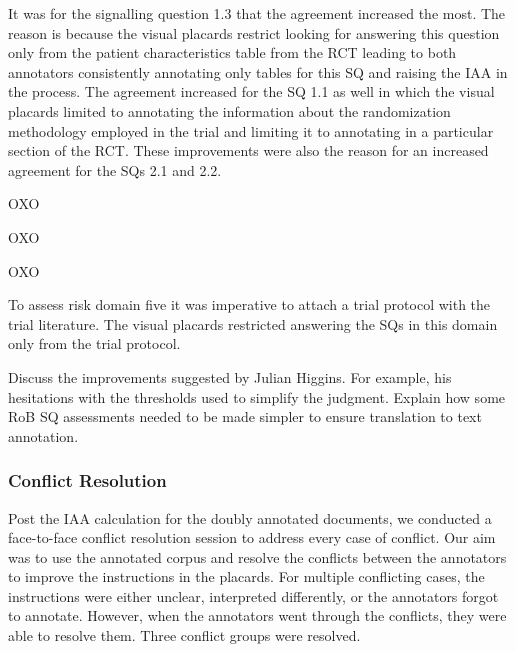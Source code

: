 \documentclass[sn-mathphys,Numbered]{sn-jnl}%
\theoremstyle{thmstyleone}%
\theoremstyle{thmstyletwo}%
\theoremstyle{thmstylethree}%
\begin{document}
It was for the signalling question 1.3 that the agreement increased the most. 
The reason is because the visual placards restrict looking for answering this question only from the patient characteristics table from the RCT leading to both annotators consistently annotating only tables for this SQ and raising the IAA in the process.
The agreement increased for the SQ 1.1 as well in which the visual placards limited to annotating the information about the randomization methodology employed in the trial and limiting it to annotating in a particular section of the RCT.
These improvements were also the reason for an increased agreement for the SQs 2.1 and 2.2.


OXO


OXO


OXO


To assess risk domain five it was imperative to attach a trial protocol with the trial literature.
The visual placards restricted answering the SQs in this domain only from the trial protocol. 

Discuss the improvements suggested by Julian Higgins. For example, his hesitations with the thresholds used to simplify the judgment.
Explain how some RoB SQ assessments needed to be made simpler to ensure translation to text annotation.
%
%
%
\subsubsection{Conflict Resolution}
\label{dis:conflict}
%
Post the IAA calculation for the doubly annotated documents, we conducted a face-to-face conflict resolution session to address every case of conflict.
Our aim was to use the annotated corpus and resolve the conflicts between the annotators to improve the instructions in the placards.
For multiple conflicting cases, the instructions were either unclear, interpreted differently, or the annotators forgot to annotate.
However, when the annotators went through the conflicts, they were able to resolve them.
Three conflict groups were resolved.
\end{document}
